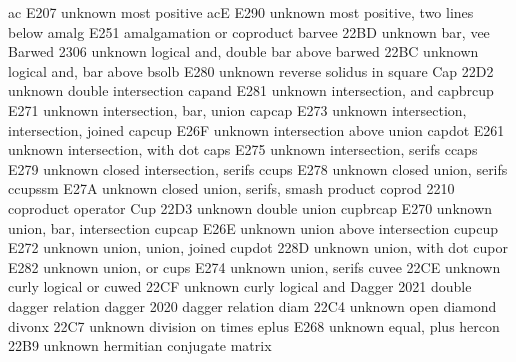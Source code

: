 %
%

 ac                    E207 {unknown} most positive
 acE                   E290 {unknown} most positive, two lines below
 amalg                 E251 {\amalg} amalgamation or coproduct
 barvee                22BD {unknown} bar, vee
 Barwed                2306 {unknown} logical and, double bar above
 barwed                22BC {unknown} logical and, bar above
 bsolb                 E280 {unknown} reverse solidus in square
 Cap                   22D2 {unknown} double intersection
 capand                E281 {unknown} intersection, and
 capbrcup              E271 {unknown} intersection, bar, union
 capcap                E273 {unknown} intersection, intersection, joined
 capcup                E26F {unknown} intersection above union
 capdot                E261 {unknown} intersection, with dot
 caps                  E275 {unknown} intersection, serifs
 ccaps                 E279 {unknown} closed intersection, serifs
 ccups                 E278 {unknown} closed union, serifs
 ccupssm               E27A {unknown} closed union, serifs, smash product
 coprod                2210 {\coprod} coproduct operator
 Cup                   22D3 {unknown} double union
 cupbrcap              E270 {unknown} union, bar, intersection
 cupcap                E26E {unknown} union above intersection
 cupcup                E272 {unknown} union, union, joined
 cupdot                228D {unknown} union, with dot
 cupor                 E282 {unknown} union, or
 cups                  E274 {unknown} union, serifs
 cuvee                 22CE {unknown} curly logical or
 cuwed                 22CF {unknown} curly logical and
 Dagger                2021 {\ddagger} double dagger relation
 dagger                2020 {\dagger} dagger relation
 diam                  22C4 {unknown} open diamond
 divonx                22C7 {unknown} division on times
 eplus                 E268 {unknown} equal, plus
 hercon                22B9 {unknown} hermitian conjugate matrix
